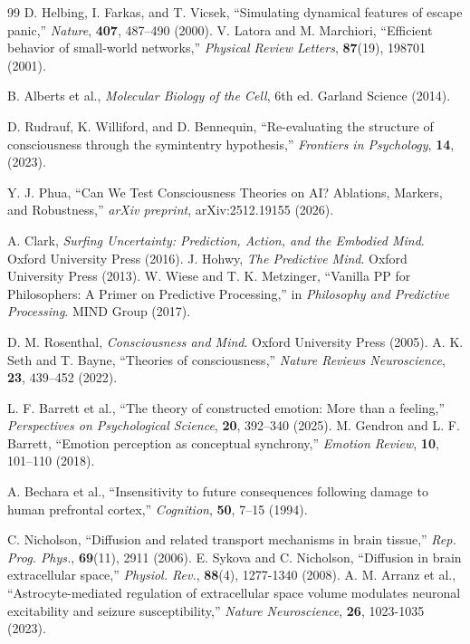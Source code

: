 \documentclass[12pt,a4paper]{article}
\begin{document}
\begin{thebibliography}{99}
		 D. Helbing, I. Farkas, and T. Vicsek, ``Simulating dynamical features of escape panic,'' \emph{Nature}, \textbf{407}, 487--490 (2000).
		 V. Latora and M. Marchiori, ``Efficient behavior of small-world networks,'' \emph{Physical Review Letters}, \textbf{87}(19), 198701 (2001).
		
		 B. Alberts et al., \emph{Molecular Biology of the Cell}, 6th ed. Garland Science (2014).
		
		 D. Rudrauf, K. Williford, and D. Bennequin, ``Re-evaluating the structure of consciousness through the symintentry hypothesis,'' \emph{Frontiers in Psychology}, \textbf{14}, (2023).
		
		 Y. J. Phua, ``Can We Test Consciousness Theories on AI? Ablations, Markers, and Robustness,'' \emph{arXiv preprint}, arXiv:2512.19155 (2026).
		
		 A. Clark, \emph{Surfing Uncertainty: Prediction, Action, and the Embodied Mind}. Oxford University Press (2016).
		 J. Hohwy, \emph{The Predictive Mind}. Oxford University Press (2013).
		 W. Wiese and T. K. Metzinger, ``Vanilla PP for Philosophers: A Primer on Predictive Processing,'' in \emph{Philosophy and Predictive Processing}. MIND Group (2017).
		
		 D. M. Rosenthal, \emph{Consciousness and Mind}. Oxford University Press (2005).
		 A. K. Seth and T. Bayne, ``Theories of consciousness,'' \emph{Nature Reviews Neuroscience}, \textbf{23}, 439--452 (2022).
		
		 L. F. Barrett et al., ``The theory of constructed emotion: More than a feeling,'' \emph{Perspectives on Psychological Science}, \textbf{20}, 392--340 (2025).
		 M. Gendron and L. F. Barrett, ``Emotion perception as conceptual synchrony,'' \emph{Emotion Review}, \textbf{10}, 101--110 (2018).
		
		 A. Bechara et al., ``Insensitivity to future consequences following damage to human prefrontal cortex,'' \emph{Cognition}, \textbf{50}, 7--15 (1994).
		
		 C. Nicholson, ``Diffusion and related transport mechanisms in brain tissue,'' \emph{Rep. Prog. Phys.}, \textbf{69}(11), 2911 (2006).
		 E. Sykova and C. Nicholson, ``Diffusion in brain extracellular space,'' \emph{Physiol. Rev.}, \textbf{88}(4), 1277-1340 (2008).
		 A. M. Arranz et al., ``Astrocyte-mediated regulation of extracellular space volume modulates neuronal excitability and seizure susceptibility,'' \emph{Nature Neuroscience}, \textbf{26}, 1023-1035 (2023).
		

\end{thebibliography}
\end{document}
